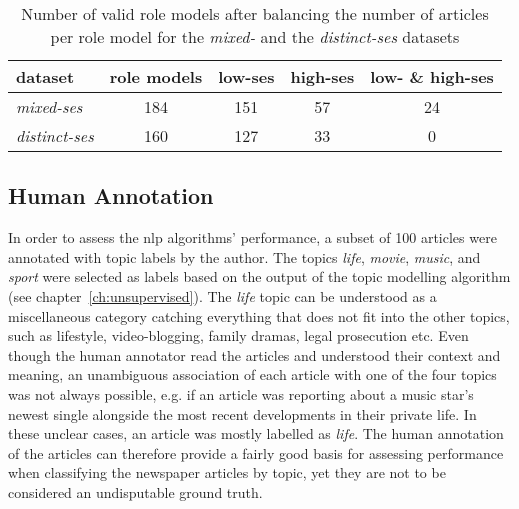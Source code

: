 \begin{table}
    \centering
    \begin{tabular}{lcccc}
        \toprule 
        dataset & role models & low-\gls{ses} & high-\gls{ses} & low- \& high-\gls{ses} \\ \toprule 
        \textit{mixed-\gls{ses}} & \SI{184}{} & \SI{151}{} & \SI{57}{} & \SI{24}{} \\
        \textit{distinct-\gls{ses}} & \SI{160}{} & \SI{127}{} & \SI{33}{} & \SI{0}{} \\
        \bottomrule
    \end{tabular}
    \caption{Number of valid role models after balancing the number of articles per role model for the \textit{mixed-} and the \textit{distinct-\gls{ses}} datasets}
    \label{tab:role_models_after_balancing}
\end{table}

\subsection*{Human Annotation}
In order to assess the \gls{nlp} algorithms' performance, a subset of \SI{100}{} articles were annotated with topic labels by the author. The topics \textit{life}, \textit{movie}, \textit{music}, and \textit{sport} were selected as labels based on the output of the topic modelling algorithm (see chapter~\ref{ch:unsupervised}). The \textit{life} topic can be understood as a miscellaneous category catching everything that does not fit into the other topics, such as lifestyle, video-blogging, family dramas, legal prosecution etc. Even though the human annotator read the articles and understood their context and meaning, an unambiguous association of each article with one of the four topics was not always possible, e.g. if an article was reporting about a music star's newest single alongside the most recent developments in their private life. In these unclear cases, an article was mostly labelled as \textit{life}. The human annotation of the articles can therefore provide a fairly good basis for assessing performance when classifying the newspaper articles by topic, yet they are not to be considered an undisputable ground truth.

